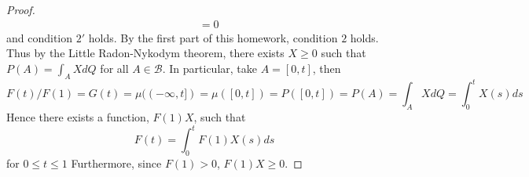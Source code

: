 \documentclass[letterpaper, 12pt]{article}
\newcommand{\cA}{\mathcal{A}}
\newcommand{\sB}{\mathscr{B}}
\begin{document}
\begin{proof}
\begin{align*}
&=
0
\end{align*}
and condition $2'$ holds. 
By the first part of this homework, condition $2$ holds. Thus by the Little Radon-Nykodym theorem, there exists $X \geq 0$ such that $P(A) = \int_A X dQ$ for all $A \in \sB$. In particular, take $A = [0, t]$, then 
\[
F(t)/F(1) = G(t) = \mu((-\infty, t]) = \mu([0,t]) = P([0,t]) = P(A) = \int_A X dQ = \int_0^t X(s) ds
\] 
Hence there exists a function, $F(1)X$, such that
\[
F(t) = \int_0^t F(1) X(s) ds
\]
for $0 \leq t \leq 1$
Furthermore, since $F(1) >0$, $F(1) X \geq 0$.
\end{proof}
\end{document}
